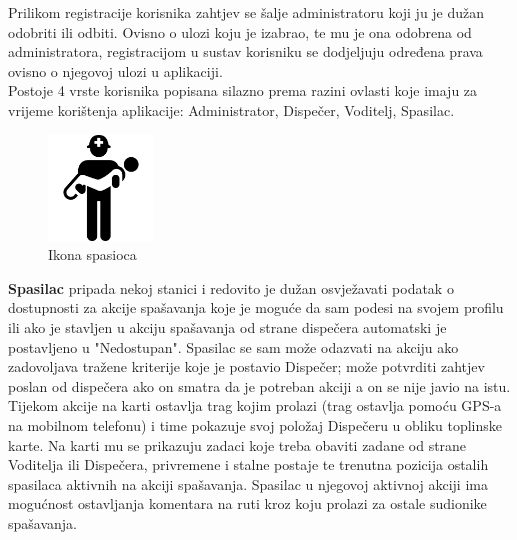 		{Prilikom registracije korisnika zahtjev se šalje administratoru koji ju je dužan odobriti ili odbiti. Ovisno o ulozi koju je izabrao, te mu je ona odobrena od administratora, registracijom u sustav korisniku se dodjeljuju određena prava ovisno o njegovoj ulozi u aplikaciji.\\
			
			Postoje 4 vrste korisnika popisana silazno prema razini ovlasti koje imaju za vrijeme korištenja aplikacije: Administrator, Dispečer, Voditelj, Spasilac.\\ 
			
			\begin{figure}
				\centering
				\includegraphics[width=0.25\textwidth]{./slike/spasioc.png}
				\caption{Ikona spasioca}
			\end{figure}
			\textbf{Spasilac} pripada nekoj stanici i redovito je dužan osvježavati podatak o dostupnosti za akcije spašavanja koje je moguće da sam podesi na svojem profilu ili ako je stavljen u akciju spašavanja od strane dispečera automatski je postavljeno u "Nedostupan". Spasilac se sam može odazvati na akciju ako zadovoljava tražene kriterije koje je postavio Dispečer; može potvrditi zahtjev poslan od dispečera ako on smatra da je potreban akciji a on se nije javio na istu.\\ Tijekom akcije na karti ostavlja trag kojim prolazi (trag ostavlja pomoću GPS-a na mobilnom telefonu) i time pokazuje svoj položaj Dispečeru u obliku toplinske karte. Na karti mu se prikazuju zadaci koje treba obaviti zadane od strane Voditelja ili Dispečera, privremene i stalne postaje te trenutna pozicija ostalih spasilaca aktivnih na akciji spašavanja. Spasilac u njegovoj aktivnoj akciji ima mogućnost ostavljanja komentara na ruti kroz koju prolazi za ostale sudionike spašavanja.\\
			
}
